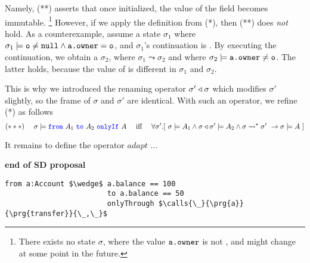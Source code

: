 Namely, (**) asserts that once initialized, the value of the field  becomes immutable. \footnote{There exists no state $\sigma$, where the value ${\texttt{a.owner}}$ is not , and might change at some point in the future.} However, if we apply the definition from (*), then (**) does \emph{not} hold. As a counterexample, assume a state $\sigma_1$ where   $\sigma_1 \models {\texttt{o}}\neq {\texttt{null}} \wedge {\texttt{a.owner}}={\texttt{o}}$, and $\sigma_1$'s continuation is .  By executing the continuation, we obtain a $\sigma_2$, where $\sigma_1 \leadsto  \sigma_2$ and where $\sigma_2  \models {\texttt{a.owner}}\neq{{\texttt{o}}}$. The latter holds, because the value of  is different in $\sigma_1$ and $\sigma_2$. 

This is why we introduced the  renaming operator $\sigma' \triangleleft \sigma$  which modifies $\sigma'$ slightly, so the frame of $\sigma$ and $\sigma'$ are identical.  With such an operator, we refine   (*) as follows
\[ (***)\  \ \ \  \sigma \models \onlyIf{A_1}{A_2}{A}\ \ \ \ \mbox{iff} \ \ \ \ \forall \sigma'.[\ \sigma \models {A_1} \wedge \adapt{\sigma}{\sigma'}  \models {A_2} \wedge \sigma \leadsto^* \sigma' \ \rightarrow  \sigma \models A \ ] \]

It remains to define the operator $adapt$ ...

 
\noindent
\textbf{end of SD proposal}

%
%
\begin{lstlisting}[language = Chainmail, mathescape=true, frame=lines]
                    from a:Account $\wedge$ a.balance == 100
                        to a.balance == 50
                        onlyThrough $\calls{\_}{\prg{a}}{\prg{transfer}}{\_,\_}$
\end{lstlisting}
%
%
%
%

